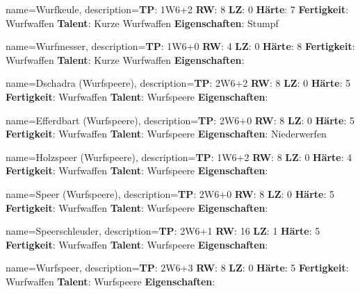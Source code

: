 {
    name={Wurfkeule},
    description={\textbf{TP}: 1W6+2 \textbf{RW}: 8 \textbf{LZ}: 0 \textbf{Härte}: 7        \textbf{Fertigkeit}: Wurfwaffen \textbf{Talent}: Kurze Wurfwaffen \textbf{{Eigenschaften}}: Stumpf}
}



{
    name={Wurfmesser},
    description={\textbf{TP}: 1W6+0 \textbf{RW}: 4 \textbf{LZ}: 0 \textbf{Härte}: 8        \textbf{Fertigkeit}: Wurfwaffen \textbf{Talent}: Kurze Wurfwaffen \textbf{{Eigenschaften}}: }
}



{
    name={Dschadra (Wurfspeere)},
    description={\textbf{TP}: 2W6+2 \textbf{RW}: 8 \textbf{LZ}: 0 \textbf{Härte}: 5        \textbf{Fertigkeit}: Wurfwaffen \textbf{Talent}: Wurfspeere \textbf{{Eigenschaften}}: }
}



{
    name={Efferdbart (Wurfspeere)},
    description={\textbf{TP}: 2W6+0 \textbf{RW}: 8 \textbf{LZ}: 0 \textbf{Härte}: 5        \textbf{Fertigkeit}: Wurfwaffen \textbf{Talent}: Wurfspeere \textbf{{Eigenschaften}}: Niederwerfen}
}



{
    name={Holzspeer (Wurfspeere)},
    description={\textbf{TP}: 1W6+2 \textbf{RW}: 8 \textbf{LZ}: 0 \textbf{Härte}: 4        \textbf{Fertigkeit}: Wurfwaffen \textbf{Talent}: Wurfspeere \textbf{{Eigenschaften}}: }
}



{
    name={Speer (Wurfspeere)},
    description={\textbf{TP}: 2W6+0 \textbf{RW}: 8 \textbf{LZ}: 0 \textbf{Härte}: 5        \textbf{Fertigkeit}: Wurfwaffen \textbf{Talent}: Wurfspeere \textbf{{Eigenschaften}}: }
}



{
    name={Speerschleuder},
    description={\textbf{TP}: 2W6+1 \textbf{RW}: 16 \textbf{LZ}: 1 \textbf{Härte}: 5        \textbf{Fertigkeit}: Wurfwaffen \textbf{Talent}: Wurfspeere \textbf{{Eigenschaften}}: }
}



{
    name={Wurfspeer},
    description={\textbf{TP}: 2W6+3 \textbf{RW}: 8 \textbf{LZ}: 0 \textbf{Härte}: 5        \textbf{Fertigkeit}: Wurfwaffen \textbf{Talent}: Wurfspeere \textbf{{Eigenschaften}}: }
}



